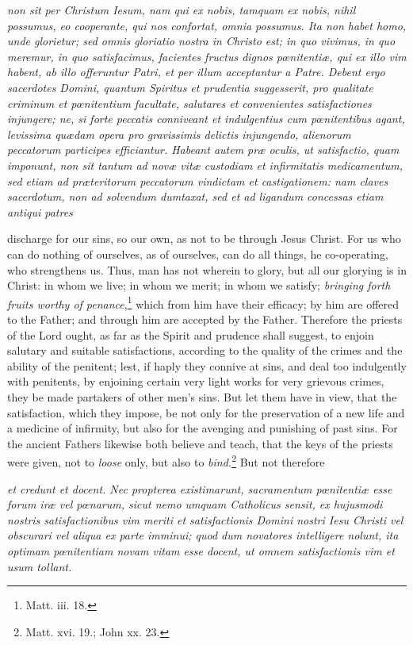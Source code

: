 \emph{non sit per Christum Iesum, nam qui ex nobis, tamquam ex nobis, nihil possumus, eo cooperante, qui nos confortat, omnia possumus. Ita non habet homo, unde glorietur; sed omnis gloriatio nostra in Christo est; in quo vivimus, in quo meremur, in quo satisfacimus, facientes fructus dignos pœnitentiæ, qui ex illo vim habent, ab illo offeruntur Patri, et per illum acceptantur a Patre. Debent ergo sacerdotes Domini, quantum Spiritus et prudentia suggesserit, pro qualitate criminum et pœnitentium facultate, salutares et convenientes satisfactiones injungere; ne, si forte peccatis conniveant et indulgentius cum pœnitentibus agant, levissima quædam opera pro gravissimis delictis injungendo, alienorum peccatorum participes efficiantur. Habeant autem præ oculis, ut satisfactio, quam imponunt, non sit tantum ad novæ vitæ custodiam et infirmitatis medicamentum, sed etiam ad præteritorum peccatorum vindictam et castigationem: nam claves sacerdotum, non ad solvendum dumtaxat, sed et ad ligandum concessas etiam antiqui patres }

discharge for our sins, so our own, as not to be through Jesus Christ. For us who can do nothing of ourselves, as of ourselves, can do all things, he co-operating, who strengthens us. Thus, man has not wherein to glory, but all our glorying is in Christ: in whom we live; in whom we merit; in whom we satisfy; \emph{bringing forth fruits worthy of penance},\footnote{\par   Matt. iii. 18.} which from him have their efficacy; by him are offered to the Father; and through him are accepted by the Father. Therefore the priests of the Lord ought, as far as the Spirit and prudence shall suggest, to enjoin salutary and suitable satisfactions, according to the quality of the crimes and the ability of the penitent; lest, if haply they connive at sins, and deal too indulgently with penitents, by enjoining certain very light works for very grievous crimes, they be made partakers of other men's sins. But let them have in view, that the satisfaction, which they impose, be not only for the preservation of a new life and a medicine of infirmity, but also for the avenging and punishing of past sins. For the ancient Fathers likewise both believe and teach, that the keys of the priests were given, not to \emph{loose} only, but also to \emph{bind.}\footnote{\par   Matt. xvi. 19.;  John xx. 23.} But not therefore

\emph{et credunt et docent. Nec propterea existimarunt, sacramentum pœnitentiæ esse forum iræ vel pœnarum, sicut nemo umquam Catholicus sensit, ex hujusmodi nostris satisfactionibus vim meriti et satisfactionis Domini nostri Iesu Christi vel obscurari vel aliqua ex parte imminui; quod dum novatores intelligere nolunt, ita optimam pœnitentiam novam vitam esse docent, ut omnem satisfactionis vim et usum tollant.}

